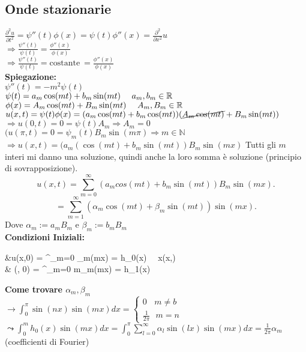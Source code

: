 \documentclass{article}
\begin{document}
	\subsection{Onde stazionarie}
	$\frac {\partial ^2 u}{\partial t^2} = \psi''(t)\phi(x) = \psi(t)\phi''(x) = \frac {\partial^2}{\partial x^2}u$\\
	$ \Rightarrow \frac {\psi''(t)}{\psi(t)} = \frac{\phi''(x)}{\phi(x)}$ \\
	$ \Rightarrow \frac {\psi''(t)}{\psi (t)} = \text {costante} \ = \frac{\phi''(x)}{\phi(x)}$\\[10px]
	\textbf{Spiegazione:}\\
	$\psi''(t) = -m^2\psi(t)$\\
	$\psi(t) = a_m\cos(mt) + b_m\sin(mt) \ \ \ \ a_m,b_m\in \R$\\
	$\phi(x) = A_m\cos(mt) + B_m\sin(mt) \ \ \ \ A_m,B_m\in \R$\\[20px]
	$u(x,t) = \psi(t)\phi(x) = (a_m \cos(mt) + b_m\cos(mt)) (\cancel{A_m\cos(mt)} + B_m\sin(mt))$\\
	$ \Rightarrow u(0,t) = 0 = \psi(t)A_m \Rightarrow A_m = 0$ \\
	$(u(\pi,t) = 0 = \psi_m(t)B_m\sin(m\pi) \Rightarrow  m\in \mathbb N$ \\
	$ \Rightarrow u(x,t) = (a_m(\cos(mt) + b_m\sin(mt))B_m\sin(mx)$
	Tutti gli $m$ interi mi danno una soluzione, quindi anche la loro somma è soluzione (principio di sovrapposizione).
	\[
	u(x,t) = \sum_{m=0}^\infty (a_mcos(mt) + b_m\sin(mt))B_m\sin(mx)
	.\] 
	\[
	=\sum^\infty_{m=1} (\alpha_m\cos(mt) + \beta_m\sin(mt))\sin(mx)
	.\] 
	Dove $\alpha_m:=a_mB_m $ e  $\beta_m:=b_mB_m$\\
	 \textbf{Condizioni Iniziali:}\\
	 \begin{aligend}
	 &\displaystyle u(x,0) = \sum^\infty_{m=0} \alpha_m\sin(mx) = h_0(x) \ \ \foral x\in (x,\pi)\\
	 & (\alpha, 0) = \sum^\infty_{m=0} m\beta_m\sin(mx) = h_1(x)
	 	
	 \end{aligend}
	 \textbf{Come trovare $\alpha_m, \beta_m$ }\\
	 $ \displaystyle \rightarrow\int_0^\pi\sin(nx)\sin(mx)dx = \begin{cases}
	 	0 \ \ \ \ m\neq b\\
		\frac{1} {2\pi} \ \ \ m = n
	 \end{cases}$\\
	 $\displaystyle\leadsto \int^m_0 h_0(x)\sin(mx)dx = \int_0^\pi \sum^\infty_{l=0}\alpha_l\sin(lx)\sin(mx)dx = \frac {1}{2\pi} \alpha_m$ (coefficienti di Fourier)\\
\end{document}
